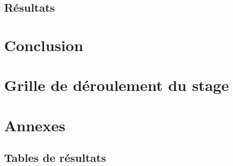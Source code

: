 \documentclass[a4paper,12pt,french]{article}
\begin{document}
\subsection{Résultats}


\section{Conclusion}


\section{Grille de déroulement du stage}


\newpage

\printbibliography[
heading=bibintoc,
title={Bibliographie}
]

\newpage
\section*{Annexes}


\subsection*{Tables de résultats}

\end{document}
